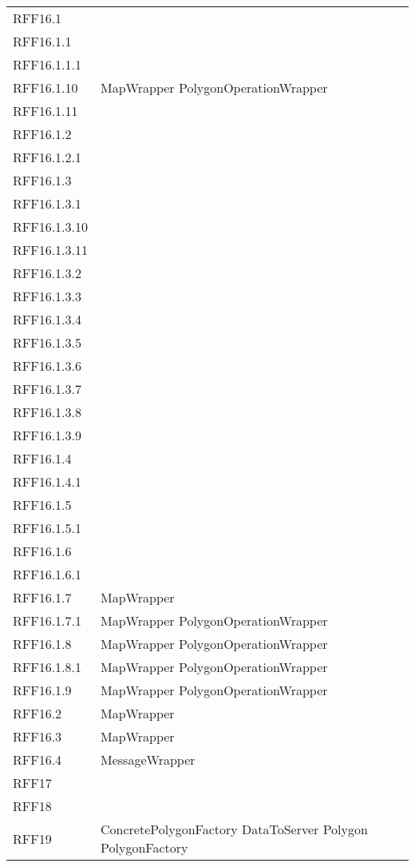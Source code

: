 \begin{longtable}{p{2.5cm}!{\VRule[1pt]}p{5cm}}
	RFF16.1 & \\
	RFF16.1.1 & \\
	RFF16.1.1.1 & \\
	RFF16.1.10 & MapWrapper \newline PolygonOperationWrapper\\
	RFF16.1.11 & \\
	RFF16.1.2 & \\
	RFF16.1.2.1 & \\
	RFF16.1.3 & \\
	RFF16.1.3.1 & \\
	RFF16.1.3.10 & \\
	RFF16.1.3.11 & \\
	RFF16.1.3.2 & \\
	RFF16.1.3.3 & \\
	RFF16.1.3.4 & \\
	RFF16.1.3.5 & \\
	RFF16.1.3.6 & \\
	RFF16.1.3.7 & \\
	RFF16.1.3.8 & \\
	RFF16.1.3.9 & \\
	RFF16.1.4 & \\
	RFF16.1.4.1 & \\
	RFF16.1.5 & \\
	RFF16.1.5.1 & \\
	RFF16.1.6 & \\
	RFF16.1.6.1 & \\
	RFF16.1.7 & MapWrapper\\
	RFF16.1.7.1 & MapWrapper \newline PolygonOperationWrapper\\
	RFF16.1.8 & MapWrapper \newline PolygonOperationWrapper\\
	RFF16.1.8.1 & MapWrapper \newline PolygonOperationWrapper\\
	RFF16.1.9 & MapWrapper \newline PolygonOperationWrapper\\
	RFF16.2 & MapWrapper\\
	RFF16.3 & MapWrapper\\
	RFF16.4 & MessageWrapper\\
	RFF17 & \\
	RFF18 & \\
	RFF19 & ConcretePolygonFactory \newline DataToServer \newline Polygon \newline PolygonFactory\\

\end{longtable}
